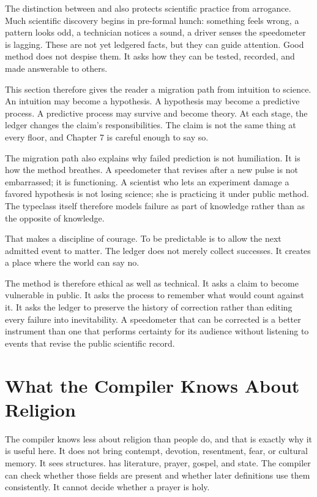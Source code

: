 The distinction between  and  also protects
scientific practice from arrogance. Much scientific discovery begins in
pre-formal hunch: something feels wrong, a pattern looks odd, a technician
notices a sound, a driver senses the speedometer is lagging. These are not yet
ledgered facts, but they can guide attention. Good method does not despise
them. It asks how they can be tested, recorded, and made answerable to others.

This section therefore gives the reader a migration path from intuition to
science. An intuition may become a hypothesis. A hypothesis may become a
predictive process. A predictive process may survive and become theory. At
each stage, the ledger changes the claim's responsibilities. The claim is not
the same thing at every floor, and Chapter 7 is careful enough to say so.

The migration path also explains why failed prediction is not humiliation. It
is how the method breathes. A speedometer that revises after a new pulse is not
embarrassed; it is functioning. A scientist who lets an experiment damage a
favored hypothesis is not losing science; she is practicing it under public
method. The typeclass itself
therefore models failure as part of knowledge rather than as the opposite of
knowledge.

That makes  a discipline of courage. To be predictable is to
allow the next admitted event to matter. The ledger does not merely collect
successes. It creates a place where the world can say no.

The method is therefore ethical as well as technical. It asks a claim to become
vulnerable in public. It asks the process to remember what would count against
it. It asks the ledger to preserve the history of correction rather than
editing every failure into inevitability. A speedometer that can be corrected
is a better instrument than one that performs certainty for its audience without
listening to events that revise the public scientific record.

\section{What the Compiler Knows About Religion}
\label{se:compiler-religion}

The compiler knows less about religion than people do, and that is exactly why
it is useful here. It does not bring contempt, devotion, resentment, fear, or
cultural memory. It sees structures.  has literature,
prayer, gospel, and state. The compiler can check whether those fields are
present and whether later definitions use them consistently. It cannot decide
whether a prayer is holy.

